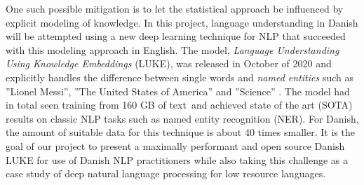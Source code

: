 \documentclass[main.tex]{subfiles}
\begin{document}
One such possible mitigation is to let the statistical approach be influenced by explicit modeling of knowledge.
In this project, language understanding in Danish will be attempted using a new deep learning technique for NLP that succeeded with this modeling approach in English.
The model, \emph{Language Understanding Using Knowledge Embeddings} (LUKE), was released in October of 2020 and explicitly handles the difference between single words and \emph{named entities} such as ''Lionel Messi'', ''The United States of America'' and ''Science'' \cite{yamada2020luke}.
The model had in total seen training from 160 GB of text\footnotemark~and achieved state of the art (SOTA) results on classic NLP tasks such as named entity recognition (NER).
For Danish, the amount of suitable data for this technique is about 40 times smaller\footnotemark.
It is the goal of our project to present a maximally performant and open source Danish LUKE for use of Danish NLP practitioners while also taking this challenge as a case study of deep natural language processing for low resource languages.

\end{document}
